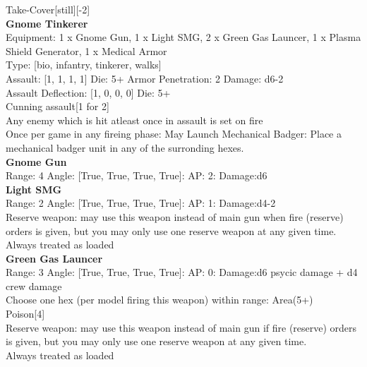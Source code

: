 Take-Cover[still][-2]\\ 


{\bf Gnome Tinkerer } \\
Equipment: 1 x Gnome Gun, 1 x Light SMG, 2 x Green Gas Launcer, 1 x Plasma Shield Generator, 1 x Medical Armor \\
Type: [bio, infantry, tinkerer, walks] \\

Assault: [1, 1, 1, 1] Die: 5+ Armor Penetration: 2 Damage: d6-2 \\
Assault Deflection: [1, 0, 0, 0] Die: 5+\\
\indent Cunning assault[1 for 2]\\ 
Any enemy which is hit atleast once in assault is set on fire\\ 

Once per game in any fireing phase: May Launch Mechanical Badger: Place a mechanical badger unit in any of the surronding hexes. \\ 


{\bf Gnome Gun } \\



Range: 4  Angle: [True, True, True, True]: AP: 2: Damage:d6 \\




{\bf Light SMG } \\



Range: 2  Angle: [True, True, True, True]: AP: 1: Damage:d4-2 \\
Reserve weapon: may use this weapon instead of main gun when fire (reserve) orders is given, but you may only use one reserve weapon at any given time.\\ 
Always treated as loaded\\ 




{\bf Green Gas Launcer } \\



Range: 3  Angle: [True, True, True, True]: AP: 0: Damage:d6 psycic damage + d4 crew damage \\
Choose one hex (per model firing this weapon) within range: Area(5+)\\ 
Poison[4]\\ 
Reserve weapon: may use this weapon instead of main gun if fire (reserve) orders is given, but you may only use one reserve weapon at any given time.\\ 
Always treated as loaded\\ 




